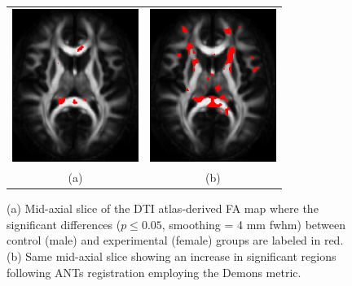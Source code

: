\documentclass[final,5p,times,twocolumn]{elsarticle}
\begin{document}
\begin{figure}
\begin{center}
\begin{tabular}{cc}
  \includegraphics[width=41mm]{smooth0_truth.png} &
  \includegraphics[width=41mm]{smooth0_demons.png} \\
  (a) & (b)
\end{tabular}
\caption{(a) Mid-axial slice of the DTI atlas-derived FA map where the 
significant differences ($p \leq 0.05$, smoothing = 4 mm fwhm) between control (male) and 
experimental (female) groups are labeled in red.  (b) Same mid-axial 
slice showing an increase in significant regions following ANTs 
registration employing the Demons metric.
}
\label{fig:simulated_projection}
\end{center}        
\end{figure}
\end{document}
